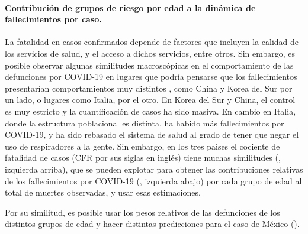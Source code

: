 \documentclass[8pt]{article}
\begin{document}
\bigskip
\paragraph{Contribución de grupos de riesgo por edad a la dinámica de fallecimientos por caso.}
La fatalidad en casos confirmados depende de factores que incluyen la calidad de los servicios de salud, y el acceso a dichos servicios, entre otros. 
Sin embargo, es posible observar algunas similitudes macroscópicas en el comportamiento de las defunciones por COVID-19 en lugares que podría pensarse que los fallecimientos presentarían comportamientos muy distintos , como China y Korea del Sur por un lado, o lugares como Italia, por el otro. 
En Korea del Sur y China, el control es muy estricto y la cuantificación de casos ha sido masiva. 
En cambio en Italia, donde la estructura poblacional es distinta, ha habido más fallecimientos por COVID-19, y ha sido rebasado el sistema de salud al grado de tener que negar el uso de respiradores a la gente. 
Sin embargo, en los tres paises el cociente de fatalidad de casos (CFR por sus siglas en inglés) tiene muchas similitudes (, izquierda arriba), que se pueden explotar para obtener las contribuciones relativas de los fallecimientos por COVID-19 (, izquierda abajo) por cada grupo de edad al total de muertes observadas, y usar esas estimaciones. 

Por su similitud, es posible usar los pesos relativos de las defunciones de los distintos grupos de edad y  hacer distintas predicciones para el caso de México ().
\end{document}
